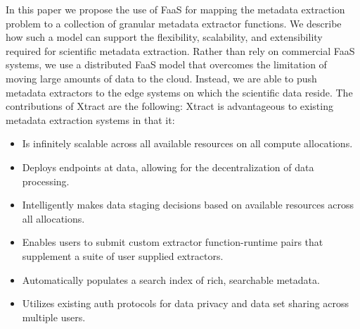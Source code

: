 \documentclass[sigconf]{acmart}
\newcommand{\tyler}[1]{}
\newcommand{\tyler}[1]{{\textcolor{cyan}{ tyler: #1 }}}
\newcommand{\name}{Xtract}
\newcommand{\funcx}{$f$\kern-0.18em\emph{unc}\kern-0.05em X}
\begin{document}

\tyler{unplagiarize the first 3 sentences here}
In this paper we propose the use of FaaS for mapping the metadata extraction problem to a 
collection of granular metadata extractor functions. 
We describe how such a model can support the flexibility, scalability, and extensibility required
for scientific metadata extraction. 
Rather than rely on commercial FaaS systems, we use a distributed FaaS model 
that overcomes the limitation of moving large amounts of data to the cloud. 
Instead, we are able to push
metadata extractors to the edge systems on which the scientific data reside. 
The contributions of \name{} are the following: 
\name{} is advantageous to existing metadata extraction 
systems in that it: 
\begin{itemize}
\item Is infinitely scalable across all available resources on all compute allocations. 
\item Deploys endpoints at data, allowing for the decentralization of data processing. 
\item Intelligently makes data staging decisions based on available resources across all allocations.
\item Enables users to submit custom extractor function-runtime pairs that supplement a suite of user supplied extractors.
\item Automatically populates a search index of rich, searchable metadata. 
\item Utilizes existing auth protocols for data privacy and data set sharing across multiple users. 
\end{itemize}

%
%
\end{document}
